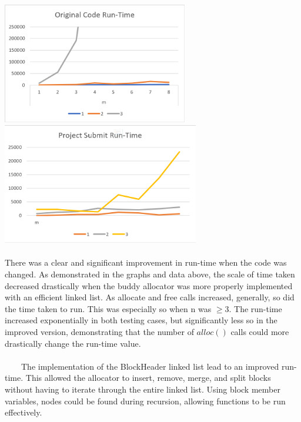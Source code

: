 \documentclass{article}
\begin{document}
\includegraphics[height=5.3cm ]{Graph2.png}
\includegraphics[height=5.3cm ]{graph1.png}

\paragraph{}
\begin{large} There was a clear and significant improvement in run-time when the code was changed. As demonstrated in the graphs and data above, the scale of time taken decreased drastically when the buddy allocator was more properly implemented with an efficient linked list. As allocate and free calls increased, generally, so did the time taken to run. This was especially so when n was $\geq 3$. The run-time increased exponentially in both testing cases, but significantly less so in the improved version, demonstrating that the number of $alloc()$ calls could more drastically change the run-time value.
\\ \\
\ \ \ \ The implementation of the BlockHeader linked list lead to an improved run-time. This allowed the allocator to insert, remove, merge, and split blocks without having to iterate through the entire linked list. Using block member variables, nodes could be found during recursion, allowing functions to be run effectively.



\end{large}

  
\end{document}
